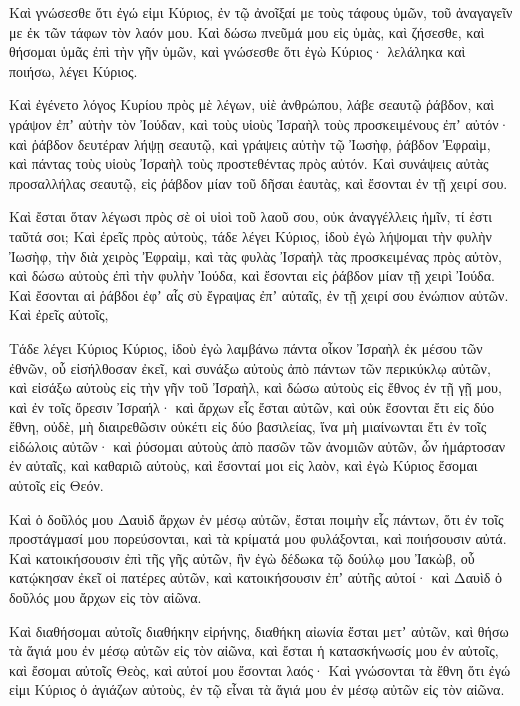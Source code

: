 {Καὶ γνώσεσθε ὅτι ἐγώ εἰμι Κύριος, ἐν τῷ ἀνοῖξαί με τοὺς τάφους ὑμῶν, τοῦ ἀναγαγεῖν με ἐκ τῶν τάφων τὸν λαόν μου.
Καὶ δώσω πνεῦμά μου εἰς ὑμὰς, καὶ ζήσεσθε, καὶ θήσομαι ὑμᾶς ἐπὶ τὴν γῆν ὑμῶν, καὶ γνώσεσθε ὅτι ἐγὼ Κύριος· λελάληκα καὶ ποιήσω, λέγει Κύριος.
\par }{\PP {}Καὶ ἐγένετο λόγος Κυρίου πρὸς μὲ λέγων,
υἱὲ ἀνθρώπου, λάβε σεαυτῷ ῥάβδον, καὶ γράψον ἐπʼ αὐτὴν τὸν Ἰούδαν, καὶ τοὺς υἱοὺς Ἰσραὴλ τοὺς προσκειμένους ἐπʼ αὐτόν· καὶ ῥάβδον δευτέραν λήψῃ σεαυτῷ, καὶ γράψεις αὐτὴν τῷ Ἰωσὴφ, ῥάβδον Ἐφραὶμ, καὶ πάντας τοὺς υἱοὺς Ἰσραὴλ τοὺς προστεθέντας πρὸς αὐτόν.
Καὶ συνάψεις αὐτὰς προσαλλήλας σεαυτῷ, εἰς ῥάβδον μίαν τοῦ δῆσαι ἑαυτὰς, καὶ ἔσονται ἐν τῇ χειρί σου.
\par }{\PP {}Καὶ ἔσται ὅταν λέγωσι πρὸς σὲ οἱ υἱοὶ τοῦ λαοῦ σου, οὐκ ἀναγγέλλεις ἡμῖν, τί ἐστι ταῦτά σοι;
Καὶ ἐρεῖς πρὸς αὐτοὺς, τάδε λέγει Κύριος, ἰδοὺ ἐγὼ λήψομαι τὴν φυλὴν Ἰωσὴφ, τὴν διὰ χειρὸς Ἐφραὶμ, καὶ τὰς φυλὰς Ἰσραὴλ τὰς προσκειμένας πρὸς αὐτὸν, καὶ δώσω αὐτοὺς ἐπὶ τὴν φυλὴν Ἰούδα, καὶ ἔσονται εἰς ῥάβδον μίαν τῇ χειρὶ Ἰούδα.
Καὶ ἔσονται αἱ ῥάβδοι ἐφʼ αἷς σὺ ἔγραψας ἐπʼ αὐταῖς, ἐν τῇ χειρί σου ἐνώπιον αὐτῶν.
Καὶ ἐρεῖς αὐτοῖς,
\par }{\PP Τάδε λέγει Κύριος Κύριος, ἰδοὺ ἐγὼ λαμβάνω πάντα οἶκον Ἰσραὴλ ἐκ μέσου τῶν ἐθνῶν, οὗ εἰσήλθοσαν ἐκεῖ, καὶ συνάξω αὐτοὺς ἀπὸ πάντων τῶν περικύκλῳ αὐτῶν, καὶ εἰσάξω αὐτοὺς εἰς τὴν γῆν τοῦ Ἰσραὴλ,
καὶ δώσω αὐτοὺς εἰς ἔθνος ἐν τῇ γῇ μου, καὶ ἐν τοῖς ὄρεσιν Ἰσραήλ· καὶ ἄρχων εἷς ἔσται αὐτῶν, καὶ οὐκ ἔσονται ἔτι εἰς δύο ἔθνη, οὐδὲ, μὴ διαιρεθῶσιν οὐκέτι εἰς δύο βασιλείας,
ἵνα μὴ μιαίνωνται ἔτι ἐν τοῖς εἰδώλοις αὐτῶν· καὶ ῥύσομαι αὐτοὺς ἀπὸ πασῶν τῶν ἀνομιῶν αὐτῶν, ὧν ἡμάρτοσαν ἐν αὐταῖς, καὶ καθαριῶ αὐτοὺς, καὶ ἔσονταί μοι εἰς λαὸν, καὶ ἐγὼ Κύριος ἔσομαι αὐτοῖς εἰς Θεόν.
\par }{\PP {}Καὶ ὁ δοῦλός μου Δαυὶδ ἄρχων ἐν μέσῳ αὐτῶν, ἔσται ποιμὴν εἷς πάντων, ὅτι ἐν τοῖς προστάγμασί μου πορεύσονται, καὶ τὰ κρίματά μου φυλάξονται, καὶ ποιήσουσιν αὐτά.
Καὶ κατοικήσουσιν ἐπὶ τῆς γῆς αὐτῶν, ἣν ἐγὼ δέδωκα τῷ δούλῳ μου Ἰακὼβ, οὗ κατῴκησαν ἐκεῖ οἱ πατέρες αὐτῶν, καὶ κατοικήσουσιν ἐπʼ αὐτῆς αὐτοί· καὶ Δαυὶδ ὁ δοῦλός μου ἄρχων εἰς τὸν αἰῶνα.
\par }{\PP {}Καὶ διαθήσομαι αὐτοῖς διαθήκην εἰρήνης, διαθήκη αἰωνία ἔσται μετʼ αὐτῶν, καὶ θήσω τὰ ἅγιά μου ἐν μέσῳ αὐτῶν εἰς τὸν αἰῶνα,
καὶ ἔσται ἡ κατασκήνωσίς μου ἐν αὐτοῖς, καὶ ἔσομαι αὐτοῖς Θεὸς, καὶ αὐτοί μου ἔσονται λαός·
Καὶ γνώσονται τὰ ἔθνη ὅτι ἐγώ εἰμι Κύριος ὁ ἁγιάζων αὐτοὺς, ἐν τῷ εἶναι τὰ ἅγιά μου ἐν μέσῳ αὐτῶν εἰς τὸν αἰῶνα.

}
